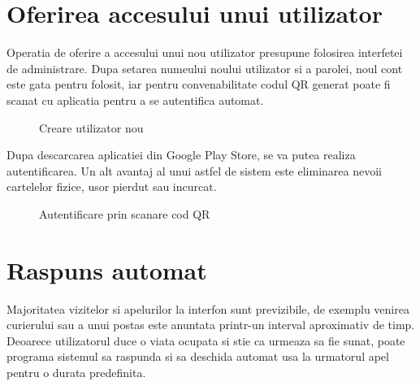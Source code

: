 \section{Oferirea accesului unui utilizator}

Operatia de oferire a accesului unui nou utilizator presupune folosirea interfetei de administrare. Dupa setarea numeului noului utilizator si a parolei, noul cont este gata pentru folosit, iar pentru convenabilitate codul QR generat poate fi scanat cu aplicatia pentru a se autentifica automat.

\begin{figure}[H]
\begin{center}
  \hfil
  \caption{Creare utilizator nou}
  \label{fig:useradd}
\end{center}
\end{figure}

Dupa descarcarea aplicatiei din Google Play Store, se va putea realiza autentificarea. Un alt avantaj al unui astfel de sistem este eliminarea nevoii cartelelor fizice, usor pierdut sau incurcat.

\begin{figure}[H]
\begin{center}
  \hfil
  \caption{Autentificare prin scanare cod QR}
  \label{fig:androidqr}
\end{center}
\end{figure}

\section{Raspuns automat}

Majoritatea vizitelor si apelurilor la interfon sunt previzibile, de exemplu venirea curierului sau a unui postas este anuntata printr-un interval aproximativ de timp. Deoarece utilizatorul duce o viata ocupata si stie ca urmeaza sa fie sunat, poate programa sistemul sa raspunda si sa deschida automat usa la urmatorul apel pentru o durata predefinita.

